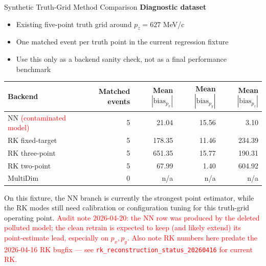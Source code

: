 \documentclass[aspectratio=169]{beamer}
\begin{document}
\begin{frame}{Synthetic Truth-Grid Method Comparison}
\small
\textbf{Diagnostic dataset}
\begin{itemize}
\item Existing five-point truth grid around \(p_z = 627\) MeV/c
\item One matched event per truth point in the current regression fixture
\item Use this only as a backend sanity check, not as a final performance benchmark
\end{itemize}

\begin{table}
\centering
\begin{tabular}{lrrrr}
\toprule
Backend & Matched events & Mean \(|\mathrm{bias}_{p_x}|\) & Mean \(|\mathrm{bias}_{p_y}|\) & Mean \(|\mathrm{bias}_{p_z}|\) \\
\midrule
NN \textcolor{red}{(contaminated model)} & 5 & 21.04 & 15.56 & 3.10 \\
RK fixed-target & 5 & 178.35 & 11.46 & 234.39 \\
RK three-point & 5 & 651.35 & 15.77 & 190.31 \\
RK two-point & 5 & 67.99 & 1.40 & 604.92 \\
MultiDim & 0 & n/a & n/a & n/a \\
\bottomrule
\end{tabular}
\end{table}

\vspace{0.1cm}
On this fixture, the NN branch is currently the strongest point estimator, while the RK modes still need calibration or configuration tuning for this truth-grid operating point. \textcolor{red}{Audit note 2026-04-20: the NN row was produced by the deleted polluted model; the clean retrain is expected to keep (and likely extend) its point-estimate lead, especially on $p_x,p_y$. Also note RK numbers here predate the 2026-04-16 RK bugfix --- see \texttt{rk\_reconstruction\_status\_20260416} for current RK.}
\end{frame}
\end{document}
